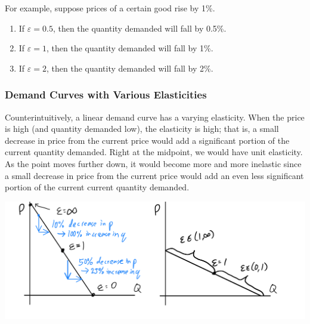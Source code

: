 \documentclass{article}
\begin{document}
    \begin{example}
      For example, suppose prices of a certain good rise by 1\%. 
      \begin{enumerate}
        \item If $\varepsilon = 0.5$, then the quantity demanded will fall by 0.5\%.
        \item If $\varepsilon = 1$, then the quantity demanded will fall by 1\%.
        \item If $\varepsilon = 2$, then the quantity demanded will fall by 2\%.
      \end{enumerate}
    \end{example}

    \subsubsection{Demand Curves with Various Elasticities}

      \begin{definition}
        Counterintuitively, a linear demand curve has a varying elasticity. When the price is high (and quantity demanded low), the elasticity is high; that is, a small decrease in price from the current price would add a significant portion of the current quantity demanded. Right at the midpoint, we would have unit elasticity. As the point moves further down, it would become more and more inelastic since a small decrease in price from the current price would add an even less significant portion of the current current quantity demanded. 
        \begin{center}
          \includegraphics[scale=0.25]{img/LInear_Curve_Elasticity.PNG}
        \end{center}
      \end{definition}
\end{document}
